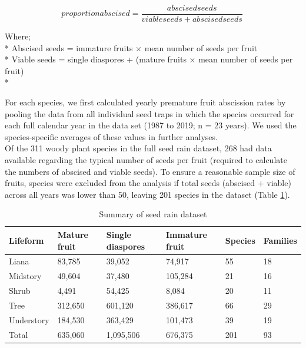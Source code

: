 \[proportion abscised = \frac{abscised seeds}{viable seeds + abscised seeds}\ \]
  

Where;\\*
Abscised seeds = immature fruits × mean number of seeds per fruit\\*
Viable seeds = single diaspores + (mature fruits × mean number of seeds per fruit)\\*

For each species, we first calculated yearly premature fruit abscission rates by pooling the data from all individual seed traps in which the species occurred for each full calendar year in the data set (1987 to 2019; n = 23 years). We used the species-specific averages of these values in further analyses.\\

Of the 311 woody plant species in the full seed rain dataset, 268 had data available regarding the typical number of seeds per fruit (required to calculate the numbers of abscised and viable seeds). To ensure a reasonable sample size of fruits, species were excluded from the analysis if total seeds (abscised + viable) across all years was lower than 50, leaving 201 species in the dataset (Table \ref{tab:summary}).\\

\begin{table}
    \centering
    \caption{Summary of seed rain dataset}
    \begin{tabular}{|l|l|l|l|l|l|}
    \hline
        Lifeform &     Mature fruit &      Single diaspores &     Immature fruit &      Species &         Families \\ \hline
        Liana &                83,785  &                39,052  &                74,917  &     55  &                         18  \\ \hline
        Midstory &                49,604  &                37,480  &              105,284  &      21  &                         16  \\ \hline
        Shrub &                   4,491  &                54,425  &                   8,084  &     20  &                         11  \\ \hline
        Tree &              312,650  &              601,120  &              386,617  &               66  &                         29  \\ \hline
        Understory &              184,530  &              363,429  &              101,473  &      39  &                         19  \\ \hline
         Total &              635,060  &          1,095,506  &              676,375  &            201  &                         93  \\ \hline
    \end{tabular}
    \label{tab:summary}
\end{table}

